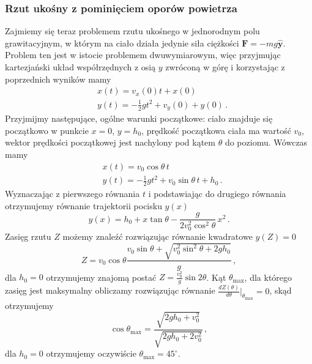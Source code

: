 \documentclass[../main.tex]{subfiles}
\begin{document}
\subsubsection{Rzut ukośny z pominięciem oporów powietrza}
Zajmiemy się teraz problemem rzutu ukośnego w jednorodnym polu grawitacyjnym, w którym na ciało działa jedynie siła ciężkości \(\mathbf{F}=-mg\mathbf{\hat y}\). Problem ten jest w istocie problemem dwuwymiarowym, więc przyjmując kartezjański układ współrzędnych z osią \(y\) zwróconą w górę i korzystając z poprzednich wyników mamy
\begin{equation*}
\begin{split}
    &x(t)=v_x(0)t+x(0)\\
    &y(t)=-\frac{1}{2}gt^2+v_y(0)+y(0)\,.
\end{split}
\end{equation*}
Przyjmijmy następujące, ogólne warunki początkowe: ciało znajduje się początkowo w punkcie \(x=0\), \(y=h_0\), prędkość początkowa ciała ma wartość \(v_0\), wektor prędkości początkowej jest nachylony pod kątem \(\theta\) do poziomu. Wówczas mamy
\begin{equation*}
    \begin{split}
        &x(t)=v_0\cos\theta\,t\\
        &y(t)=-\frac{1}{2}gt^2+v_0\sin\theta\,t+h_0\,.
    \end{split}
\end{equation*}
Wyznaczając z pierwszego równania \(t\) i podstawiając do drugiego równania otrzymujemy równanie trajektorii pocisku \(y(x)\)
\begin{equation*}
    y(x)=h_0+x\tan\theta-\frac{g}{2v_0^2\cos^2\theta}\,x^2\,.
\end{equation*}
Zasięg rzutu \(Z\) możemy znaleźć  rozwiązując równanie kwadratowe \(y(Z)=0\)
\begin{equation*}
    Z=v_0\cos\theta\frac{v_0\sin\theta+\sqrt{v_0^2\sin^2\theta+2gh_0}}{g}\,,
\end{equation*}
dla \(h_0=0\) otrzymujemy znajomą postać \(Z=\frac{v_0^2}{g}\sin2\theta\). Kąt \(\theta_\text{max}\), dla którego zasięg jest maksymalny obliczamy rozwiązując równanie \(\frac{dZ(\theta)}{d\theta}|_{\theta_\text{max}}=0\), skąd otrzymujemy
\begin{equation*}
    \cos\theta_\text{max}=\frac{\sqrt{2gh_0+v_0^2}}{\sqrt{2gh_0+2v_0^2}}\,,
\end{equation*}
dla \(h_0=0\) otrzymujemy oczywiście \(\theta_\text{max}=45^\circ\).
\end{document}
